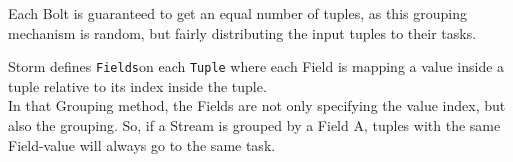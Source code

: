 	\begin{description}
			Each Bolt is guaranteed to get an equal number of tuples, as this grouping mechanism is random, but fairly distributing the input tuples to their tasks.
		
			Storm defines \texttt{Fields}on each \texttt{Tuple} where each Field is mapping a value inside a tuple relative to its index inside the tuple. \\
			In that Grouping method, the Fields are not only specifying the value index, but also the grouping. So, if a Stream is grouped by a Field A, tuples with the same Field-value will always go to the same task.
	\end{description}

	